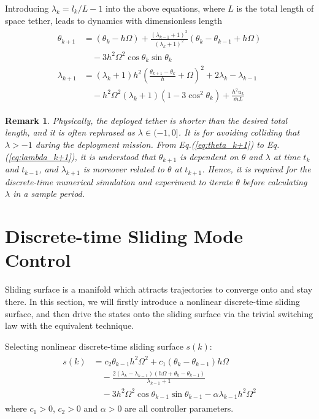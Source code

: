 \documentclass[10pt,onecolumn,draftcls]{IEEEtran}
\newtheorem{myrem}{Remark}
\begin{document}
	Introducing $\lambda_k=l_k/L-1$ into the above equations, where $L$ is the total length of space tether, leads to dynamics with dimensionless length 
	\begin{align}\begin{split}\label{eq:lambda_k+1}
		\theta_{k+1}&=\left(\theta_{k}-h\Omega\right)+\frac{(\lambda_{k-1}+1)^2}{(\lambda_k+1)^2}\left(\theta_{k}-\theta_{k-1}+h\Omega\right)\\
		&\quad-3h^2\Omega^2\cos\theta_{k}\sin\theta_{k}\\
		\lambda_{k+1}&=(\lambda_k+1)h^2\left(\frac{\theta_{k+1}-\theta_{k}}{h}+\Omega\right)^2+2\lambda_k-\lambda_{k-1}\\
		&\quad-h^2\Omega^2(\lambda_k+1)(1-3\cos^2\theta_{k})+\frac{h^2u_k}{\bar{m}L}
	\end{split}\end{align}
	\begin{myrem}\label{remark:1}
		Physically, the deployed tether is shorter than the desired total length, and it is often rephrased as $\lambda\in(-1,0]$. It is for avoiding colliding that $\lambda>-1$ during the deployment mission. From Eq.(\ref{eq:theta_k+1}) to Eq.(\ref{eq:lambda_k+1}), it is understood that $\theta_{k+1}$ is dependent on $\theta$ and $\lambda$ at time $t_k$ and $t_{k-1}$, and $\lambda_{k+1}$ is moreover related to $\theta$ at $t_{k+1}$. Hence, it is required for the discrete-time numerical simulation and experiment to iterate $\theta$ before calculating $\lambda$ in a sample period.
        \end{myrem}
        \section{Discrete-time Sliding Mode Control}\label{sec:Discrete-time Sliding Mode Control} 
	Sliding surface is a manifold which attracts trajectories to converge onto and stay there. In this section, we will firstly introduce a nonlinear discrete-time sliding surface, and then drive the states onto the sliding surface via the trivial switching law with the equivalent technique.

	Selecting nonlinear discrete-time sliding surface $s(k)$:
	\begin{align}\begin{split}\label{eq:discrete time sliding furface}
				s(k) &= c_2\theta_{k-1}h^2\Omega^2+c_1(\theta_k-\theta_{k-1})h\Omega\\
				&\quad-\frac{2(\lambda_k-\lambda_{k-1})(h\Omega+\theta_k-\theta_{k-1})}{\lambda_{k-1}+1}\\
		&\quad-3h^2\Omega^2\cos\theta_{k-1}\sin\theta_{k-1}-\alpha\lambda_{k-1}h^2\Omega^2
	\end{split}\end{align}
	where $c_1>0$, $c_2>0$ and $\alpha>0$ are all controller parameters.
\end{document}
